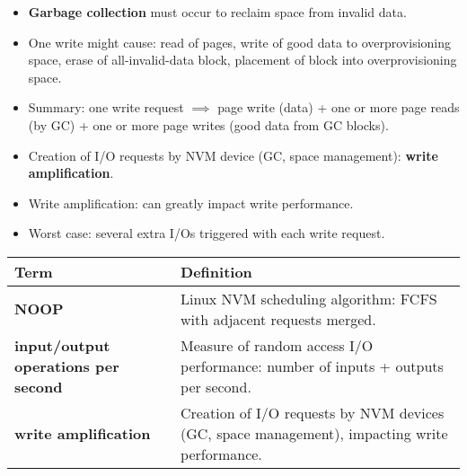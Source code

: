 \begin{itemize}
    \item \textbf{Garbage collection} must occur to reclaim space from invalid data.
    \item One write might cause: read of pages, write of good data to overprovisioning space, erase of all-invalid-data block, placement of block into overprovisioning space.
    \item Summary: one write request $\implies$ page write (data) + one or more page reads (by GC) + one or more page writes (good data from GC blocks).
    \item Creation of I/O requests by NVM device (GC, space management): \textbf{write amplification}.
    \item Write amplification: can greatly impact write performance.
    \item Worst case: several extra I/Os triggered with each write request.
\end{itemize}

\vspace{1em}
\begin{tabular}{p{}p{}}
\toprule
\rowcolor{lightgray} \textbf{Term} & \textbf{Definition} \\
\midrule
\textbf{NOOP} & Linux NVM scheduling algorithm: FCFS with adjacent requests merged. \\
\textbf{input/output operations per second} & Measure of random access I/O performance: number of inputs + outputs per second. \\
\textbf{write amplification} & Creation of I/O requests by NVM devices (GC, space management), impacting write performance. \\
\bottomrule
\end{tabular}
